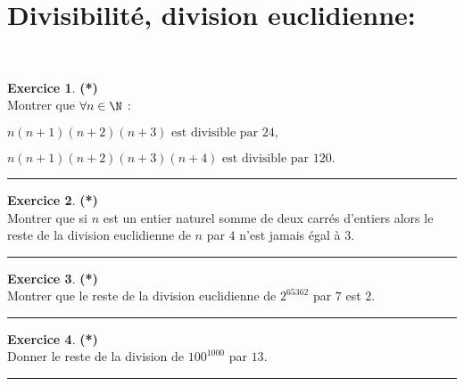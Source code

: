 \documentclass[a4paper,11pt]{article}
\theoremstyle{definition}
\newtheorem{exo}{Exercice} %
\begin{document}
 	
	

\noindent{}
\medskip




\section*{Divisibilité, division euclidienne:}\hfill\\%
\begin{minipage}{1\linewidth}
	\begin{minipage}[t]{0.48\linewidth}
		\raggedright
	
\begin{exo}\textbf{(*)}\quad\\[0.15cm]
	 Montrer que $\forall n\in \N$ :
	 
	\noindent$n(n+1)(n+2)(n+3)  \text {  est divisible par }24,$
	
		\noindent$n(n+1)(n+2)(n+3)(n+4) \text{  est divisible par }120.$
	\centering
	\rule{1\linewidth}{0.6pt}
\end{exo}



\begin{exo}\textbf{(*)}\quad\\[0.15cm]
 	Montrer que si $n$ est un entier naturel somme de deux carr\'es d'entiers 
 	alors le reste de la division euclidienne de $n$ par $4$ n'est jamais \'egal \`a $3$.
 	
	\centering
	\rule{1\linewidth}{0.6pt}
\end{exo}

\begin{exo}\textbf{(*)}\quad\\[0.15cm]
	Montrer que le reste de la division euclidienne de $2^{65362}$ par $7$ est $2$.
	
	\centering
	\rule{1\linewidth}{0.6pt}
\end{exo}

\begin{exo}\textbf{(*)}\quad\\[0.15cm]
	
	Donner le reste de la division de  $100^{1000}$ par $13$.
	
	
	\centering
	\rule{1\linewidth}{0.6pt}
\end{exo}


\end{minipage}	
\hfill\vrule\hfill
\begin{minipage}[t]{0.48\linewidth}
\raggedright


\end{minipage}
\end{minipage}
\end{document}
